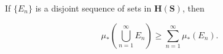 If $\{E_n\}$ is a disjoint sequence of sets in $\mathbf{H}(\mathbf{S})$, then

$$\mu_*\left(\bigcup_{n=1}^{\infty} E_n\right) \geq \sum_{n=1}^{\infty} \mu_*(E_n).$$

